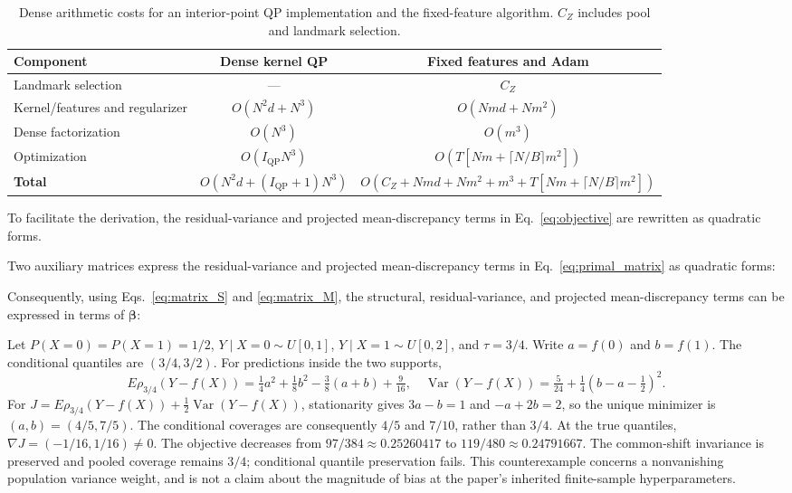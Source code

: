 \begin{table}[htbp]
\centering
\caption{Dense arithmetic costs for an interior-point QP implementation and the fixed-feature algorithm. $C_Z$ includes pool and landmark selection.}
\label{tab:complexity}
\begin{tabular}{lcc}
\toprule
\textbf{Component} & \textbf{Dense kernel QP} & \textbf{Fixed features and Adam} \\
\midrule
Landmark selection & --- & $C_Z$ \\
Kernel/features and regularizer & $O(N^2d+N^3)$ & $O(Nmd+Nm^2)$ \\
Dense factorization & $O(N^3)$ & $O(m^3)$ \\
Optimization & $O(I_{\mathrm{QP}}N^3)$ & $O(T[Nm+\lceil N/B\rceil m^2])$ \\
\midrule
\textbf{Total} & $O(N^2d+(I_{\mathrm{QP}}+1)N^3)$ & $O(C_Z+Nmd+Nm^2+m^3+T[Nm+\lceil N/B\rceil m^2])$ \\
\bottomrule
\end{tabular}
\end{table}

To facilitate the derivation, the residual-variance and projected mean-discrepancy terms in Eq.~\eqref{eq:objective} are rewritten as quadratic forms.

Two auxiliary matrices express the residual-variance and projected mean-discrepancy terms in Eq.~\eqref{eq:primal_matrix} as quadratic forms:

Consequently, using Eqs.~\eqref{eq:matrix_S} and \eqref{eq:matrix_M}, the structural, residual-variance, and projected mean-discrepancy terms can be expressed in terms of $\boldsymbol{\beta}$:

Let $P(X=0)=P(X=1)=1/2$, $Y\mid X=0\sim U[0,1]$, $Y\mid X=1\sim U[0,2]$, and $\tau=3/4$.
Write $a=f(0)$ and $b=f(1)$. The conditional quantiles are $(3/4,3/2)$.
For predictions inside the two supports,
\[
E\rho_{3/4}(Y-f(X))=\tfrac14a^2+\tfrac18b^2-\tfrac38(a+b)+\tfrac9{16},
\quad
\operatorname{Var}(Y-f(X))=\tfrac5{24}+\tfrac14(b-a-\tfrac12)^2.
\]
For $J=E\rho_{3/4}(Y-f(X))+\tfrac12\operatorname{Var}(Y-f(X))$, stationarity gives $3a-b=1$ and $-a+2b=2$, so the unique minimizer is $(a,b)=(4/5,7/5)$.
The conditional coverages are consequently $4/5$ and $7/10$, rather than $3/4$.
At the true quantiles, $\nabla J=(-1/16,1/16)\ne0$.
The objective decreases from $97/384\approx0.25260417$ to $119/480\approx0.24791667$.
The common-shift invariance is preserved and pooled coverage remains $3/4$; conditional quantile preservation fails.
This counterexample concerns a nonvanishing population variance weight, and is not a claim about the magnitude of bias at the paper's inherited finite-sample hyperparameters.


